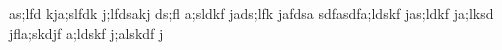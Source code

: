 as;lfd kja;slfdk j;lfdsakj ds;fl   a;sldkf
jads;lfk jafdsa sdfasdfa;ldskf jas;ldkf ja;lksd
jfla;skdjf  a;ldskf j;alskdf j

